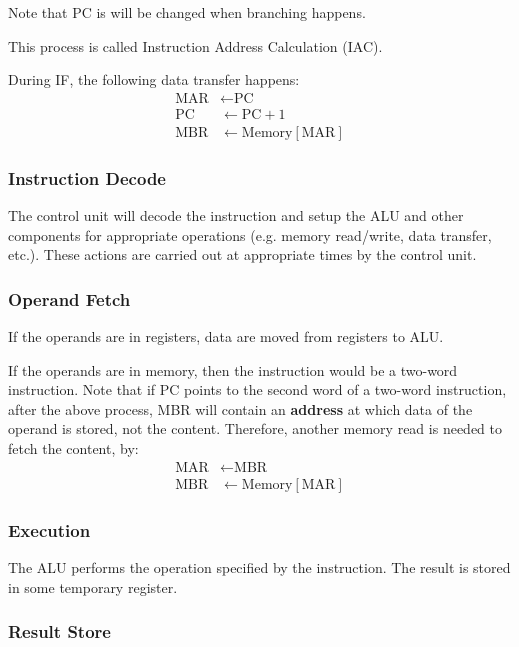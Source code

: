 Note that PC is will be changed when branching happens.

This process is called Instruction Address Calculation (IAC).

During IF, the following data transfer happens:
\begin{align*}
    \text{MAR} &\leftarrow \text{PC} \\
    \text{PC} &\leftarrow \text{PC} + 1 \\
    \text{MBR} &\leftarrow \text{Memory}[\text{MAR}]
\end{align*}

\subsubsection{Instruction Decode}

The control unit will decode the instruction and setup the ALU and other components
for appropriate operations (e.g. memory read/write, data transfer, etc.). These actions
are carried out at appropriate times by the control unit.

\subsubsection{Operand Fetch}

If the operands are in registers, data are moved from registers to ALU.

If the operands are in memory, then the instruction would be a two-word instruction.
Note that if PC points to the second word of a two-word instruction, after the above process,
MBR will contain an \textbf{address} at which data of the operand is stored,
not the content. Therefore, another
memory read is needed to fetch the content, by:
\begin{align*}
    \text{MAR} &\leftarrow \text{MBR} \\
    \text{MBR} &\leftarrow \text{Memory}[\text{MAR}]
\end{align*}

\subsubsection{Execution}

The ALU performs the operation specified by the instruction. The result is stored in
some temporary register.

\subsubsection{Result Store}

